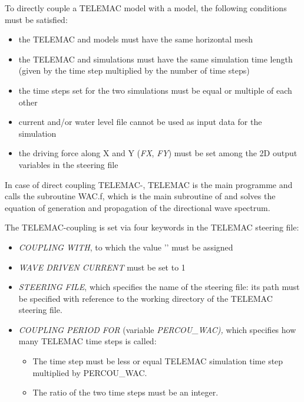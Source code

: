  To directly couple a TELEMAC model with a \tomawac model, the following conditions must be satisfied:

\begin{itemize}
\item  the TELEMAC and \tomawac models must have the same horizontal mesh

\item  the TELEMAC and \tomawac simulations must have the same simulation time length (given by the time step multiplied by the number of time steps)

\item  the time steps set for the two simulations must be equal or multiple of each other

\item  current and/or water level file cannot be used as input data for the \tomawac simulation

\item  the driving force along X and Y (\textit{FX}, \textit{FY}) must be set among the 2D output variables in the steering file
\end{itemize}

 In case of direct coupling TELEMAC-\tomawac, TELEMAC is the main programme and calls the \tomawac subroutine WAC.f, which is the main subroutine of \tomawac and solves the equation of generation and propagation of the directional wave spectrum.

 The TELEMAC-\tomawac coupling is set via four keywords in the TELEMAC steering file:

\begin{itemize}
\item  \textit{COUPLING WITH}, to which the value '\tomawac' must be assigned

\item  \textit{WAVE DRIVEN CURRENT} must be set to 1

\item  \textit{\tomawac STEERING FILE}, which specifies the name of the \tomawac steering file: its path must be specified with reference to the working directory of the TELEMAC steering file.

\item  \textit{COUPLING PERIOD FOR \tomawac} (variable \textit{PERCOU\_WAC),} which specifies how many TELEMAC time steps \tomawac is called:

\begin{itemize}
\item  The \tomawac time step must be less or equal TELEMAC simulation time step multiplied by PERCOU\_WAC.

\item  The ratio of the two time steps must be an integer.
\end{itemize}
\end{itemize}

